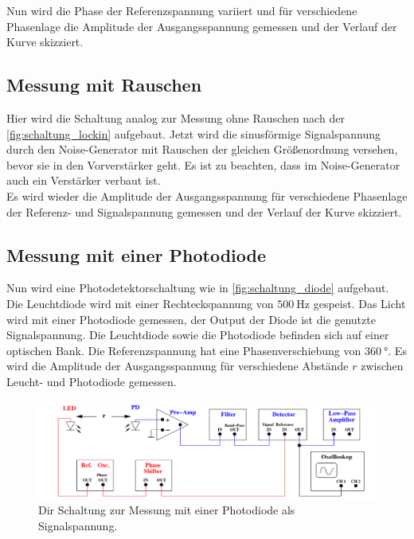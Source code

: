     \noindent Nun wird die Phase der Referenzspannung variiert und für verschiedene Phasenlage die Amplitude der Ausgangsspannung gemessen und 
    der Verlauf der Kurve skizziert. 

\subsection{Messung mit Rauschen}

    Hier wird die Schaltung analog zur Messung ohne Rauschen nach der \autoref{fig:schaltung_lockin} aufgebaut. Jetzt wird die sinusförmige 
    Signalspannung durch den Noise-Generator mit Rauschen der gleichen Größenordnung versehen, bevor sie in den Vorverstärker geht. Es ist 
    zu beachten, dass im Noise-Generator auch ein Verstärker verbaut ist. \\
    Es wird wieder die Amplitude der Ausgangsspannung für verschiedene Phasenlage der Referenz- und Signalspannung gemessen und der Verlauf 
    der Kurve skizziert. 

\subsection{Messung mit einer Photodiode}

    Nun wird eine Photodetektorschaltung wie in \autoref{fig:schaltung_diode} aufgebaut. Die Leuchtdiode wird mit einer Rechteckspannung 
    von $\SI{500}{\hertz}$ gespeist. Das Licht wird mit einer Photodiode gemessen, der Output der Diode ist die genutzte Signalspannung.
    Die Leuchtdiode sowie die Photodiode befinden sich auf einer optischen Bank.  
    Die Referenzspannung hat eine Phasenverschiebung von $\SI{360}{\degree}$. Es wird die Amplitude der Ausgangsspannung für verschiedene
    Abstände $r$ zwischen Leucht- und Photodiode gemessen.

    \begin{figure}[H]
        \centering
        \includegraphics[width=\textwidth]{bilder/schaltkreis_diode.png}
        \caption{Dir Schaltung zur Messung mit einer Photodiode als Signalspannung. \cite{anleitung}}
        \label{fig:schaltung_diode}
    \end{figure}


